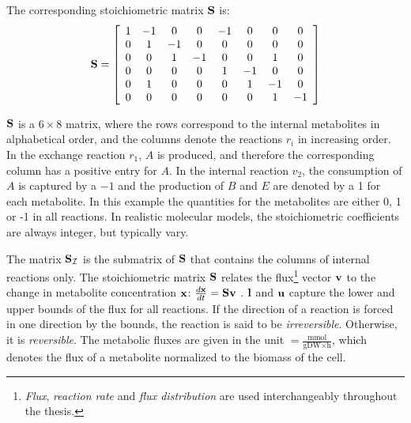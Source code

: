 The corresponding stoichiometric matrix $\bold S$ is:
\begin{equation*}
    \bold S =
    \left[\begin{array}{cccccccc}
        1 & -1 & 0 & 0 & -1 & 0 & 0 & 0\\
        0 & 1 & -1 & 0 & 0 & 0 & 0 & 0\\
        0 & 0 & 1 & -1 & 0 & 0 & 1 & 0\\
        0 & 0 & 0 & 0 & 1 & -1 & 0 & 0\\
        0 & 1 & 0 & 0 & 0 & 1 & -1 & 0\\
        0 & 0 & 0 & 0 & 0 & 0 & 1 & -1\\    
    \end{array}\right]        
\end{equation*}

$\bold S$ is a $6 \times 8$ matrix, where the rows correspond to the internal metabolites in alphabetical order, and the columns denote the reactions $r_i$ in increasing order. In the exchange reaction $r_1$, $A$ is produced, and therefore the corresponding column has a positive entry for $A$. In the internal reaction $v_2$, the consumption of $A$ is captured by a $-1$ and the production of $B$ and $E$ are denoted by a 1 for each metabolite. In this example the quantities for the metabolites are either 0, 1 or -1 in all reactions. In realistic molecular models, the stoichiometric coefficients are always integer, but typically vary.

The matrix $\bold S_\mathcal{I}$ is the submatrix of $\bold S$ that contains the columns of internal reactions only. 
The stoichiometric matrix $\bold S$ relates the flux\footnote{\textit{Flux}, \textit{reaction rate} and \textit{flux distribution} are used interchangeably throughout the thesis.} vector $\bold v$ to the change in metabolite concentration $\bold x$: $\frac{d \bold x}{dt} = \bold S \bold v$ \cite{noor_removing_2018}. 
$\bold l$ and $\bold u$ capture the lower and upper bounds of the flux for all reactions. If the direction of a reaction is forced in one direction by the bounds, the reaction is said to be \textit{irreversible}. Otherwise, it is \textit{reversible}.
The metabolic fluxes are given in the unit $= \frac{\text{mmol}}{\text{gDW} \times \text{h}}$, which denotes the flux of a metabolite normalized to the biomass of the cell.

